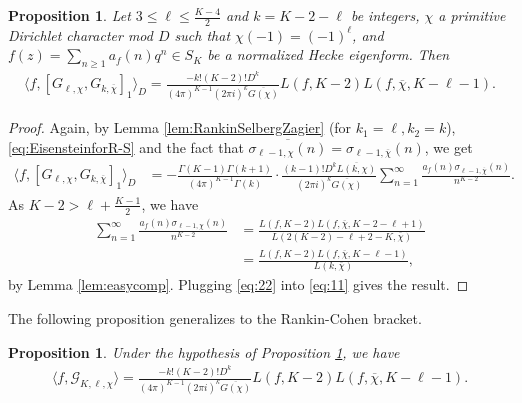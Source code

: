 \documentclass[11pt,letterpaper,reqno]{amsart}
\numberwithin{figure}{section}
\numberwithin{table}{section}
\theoremstyle{definition}
\theoremstyle{plain}
\newtheorem{proposition}[theorem]{Proposition}
\theoremstyle{definition}
\theoremstyle{definition}
\theoremstyle{remark}
\newtheorem{remark}{Remark}[section]
\numberwithin{equation}{section}
\theoremstyle{remark}
\DeclareMathOperator{\Tr}{Tr}
\begin{document}
\begin{proposition}\label{prop:rankinselbergconvolution2}
 Let $3\leq\ell\leq\frac{K-4}{2}$ and $k=K-2-\ell$ be integers, $\chi$ a primitive Dirichlet character mod $D$ such that $\chi(-1)=(-1)^{\ell}$, and $f(z)=\sum_{n\geq1}a_f(n)q^n\in S_K$ be a normalized Hecke eigenform. Then
    \begin{align}
         \langle f,[G_{\ell,\chi},G_{k,\overline{\chi}}]_1\rangle_{D}=\frac{-k!(K-2)!D^{k}}{(4\pi)^{K-1}(2\pi i)^{k}\overline{G(\chi)}}L(f,K-2)L(f,\overline{\chi},K-\ell-1). \nonumber
     \end{align}
\end{proposition}
\begin{proof}
Again, by Lemma \ref{lem:RankinSelbergZagier} (for $k_1=\ell, k_2=k$), \eqref{eq:EisensteinforR-S} and the fact that $\overline{\sigma_{\ell-1,\chi}(n)}=\sigma_{\ell-1,\overline{\chi}}(n)$, we get
    \begin{align}
        \langle f,[G_{\ell,\chi},G_{k,\overline{\chi}}]_1\rangle_{D}&=-\frac{\Gamma(K-1)\Gamma(k+1)}{(4\pi)^{K-1}\Gamma(k)}\cdot\frac{(k-1)!D^k\overline{L(k,\chi)}}{(2\pi i)^{k}\overline{G(\chi)}}\sum_{n=1}^{\infty}\frac{a_f(n)\sigma_{\ell-1,\overline{\chi}}(n)}{n^{K-2}}.\label{eq:11}
    \end{align}
As $K-2>\ell+\frac{K-1}{2}$, we have  
    \begin{align}
        \sum_{n=1}^{\infty}\frac{a_f(n)\sigma_{\ell-1,\chi}(n)}{n^{K-2}}&=\frac{L(f,K-2)L(f,\overline{\chi},K-2-\ell+1)}{L(2(K-2)-\ell+2-K,\overline{\chi})} \nonumber\\&=\frac{L(f,K-2)L(f,\overline{\chi},K-\ell-1)}{L(k,\overline{\chi})},\label{eq:22}
    \end{align}
by Lemma \ref{lem:easycomp}. Plugging   \eqref{eq:22} into \eqref{eq:11} gives the result. 
\end{proof}
The following proposition generalizes \cite[Proposition 1]{Kohnen-Zagier1981} to the  Rankin-Cohen bracket.
\begin{proposition}\label{prop:Rankin-selbergperiod2}
   Under the hypothesis of Proposition \ref{prop:rankinselbergconvolution2}, we have 
    \begin{align}
        \langle f,\mathcal{G}_{K,\ell,\chi}\rangle=\frac{-k!(K-2)!D^{k}}{(4\pi)^{K-1}(2\pi i)^{k}\overline{G(\chi)}}L(f,K-2)L(f,\overline{\chi},K-\ell-1).\label{eq:convolution2}
    \end{align}
\end{proposition}
\end{document}
